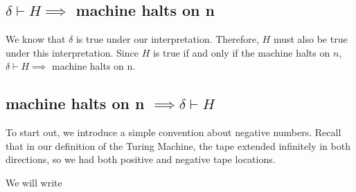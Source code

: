 \subsection{$\delta \vdash H \implies$ machine halts on n}

We know that $\delta$ is true under our interpretation.  Therefore, $H$ must also be true under this interpretation.
Since $H$ is true if and only if the machine halts on $n$, $\delta \vdash H \implies$ machine halts on n.

\subsection{machine halts on n $\implies \delta \vdash H$}

To start out, we introduce a simple convention about negative numbers. Recall that in our definition of the Turing Machine, the tape extended infinitely in both directions, so we had both positive and negative tape locations.

We will write 

